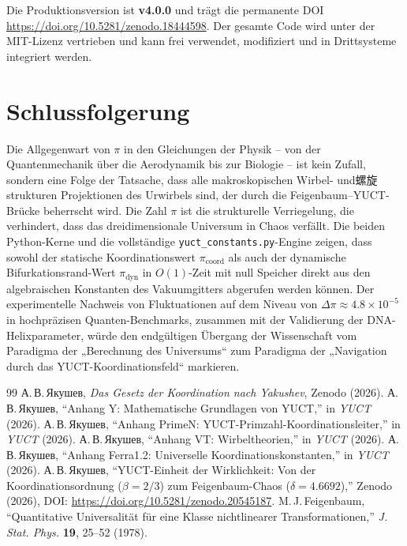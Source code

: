 \documentclass[12pt,a4paper]{article}
\begin{document}
	\noindent Die Produktionsversion ist \textbf{v4.0.0} und trägt die permanente DOI
	\url{https://doi.org/10.5281/zenodo.18444598}.  Der gesamte Code wird unter der MIT-Lizenz vertrieben und kann frei verwendet, modifiziert und in Drittsysteme integriert werden.
	
	\section{Schlussfolgerung}
	\label{sec:conclusion}
	
	Die Allgegenwart von $\pi$ in den Gleichungen der Physik – von der Quantenmechanik über die Aerodynamik bis zur Biologie – ist kein Zufall, sondern eine Folge der Tatsache, dass alle makroskopischen Wirbel- und螺旋strukturen Projektionen des Urwirbels sind, der durch die Feigenbaum–YUCT-Brücke beherrscht wird. Die Zahl $\pi$ ist die strukturelle Verriegelung, die verhindert, dass das dreidimensionale Universum in Chaos verfällt. Die beiden Python-Kerne und die vollständige \texttt{yuct\_constants.py}-Engine zeigen, dass sowohl der statische Koordinationswert $\pi_{\mathrm{coord}}$ als auch der dynamische Bifurkationsrand-Wert $\pi_{\mathrm{dyn}}$ in $O(1)$-Zeit mit null Speicher direkt aus den algebraischen Konstanten des Vakuumgitters abgerufen werden können. Der experimentelle Nachweis von Fluktuationen auf dem Niveau von $\Delta\pi \approx 4.8\times10^{-5}$ in hochpräzisen Quanten-Benchmarks, zusammen mit der Validierung der DNA-Helixparameter, würde den endgültigen Übergang der Wissenschaft vom Paradigma der „Berechnung des Universums“ zum Paradigma der „Navigation durch das YUCT-Koordinationsfeld“ markieren.
	
	\begin{thebibliography}{99}
		 А.\,В.\,Якушев, \emph{Das Gesetz der Koordination nach Yakushev}, Zenodo (2026).
		 А.\,В.\,Якушев, ``Anhang Y: Mathematische Grundlagen von YUCT,'' in \emph{YUCT} (2026).
		 А.\,В.\,Якушев, ``Anhang PrimeN: YUCT-Primzahl-Koordinationsleiter,'' in \emph{YUCT} (2026).
		 А.\,В.\,Якушев, ``Anhang VT: Wirbeltheorien,'' in \emph{YUCT} (2026).
		 А.\,В.\,Якушев, ``Anhang Ferra1.2: Universelle Koordinationskonstanten,'' in \emph{YUCT} (2026).
		 А.\,В.\,Якушев, ``YUCT-Einheit der Wirklichkeit: Von der Koordinationsordnung ($\beta=2/3$) zum Feigenbaum-Chaos ($\delta=4.6692$),'' Zenodo (2026), DOI: \url{https://doi.org/10.5281/zenodo.20545187}.
		 M.\,J.\,Feigenbaum, ``Quantitative Universalität für eine Klasse nichtlinearer Transformationen,'' \emph{J. Stat. Phys.} \textbf{19}, 25--52 (1978).
	\end{thebibliography}
	
\end{document}
